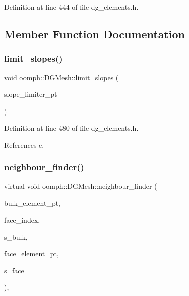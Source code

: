 Definition at line 444 of file dg\+\_\+elements.\+h.



\subsection{Member Function Documentation}
\mbox{\label{classoomph_1_1DGMesh_a0fd53356d91d991a8ad68e8a6ceb3860}} 
\subsubsection{\texorpdfstring{limit\+\_\+slopes()}{limit\_slopes()}}
{\footnotesize\ttfamily void oomph\+::\+D\+G\+Mesh\+::limit\+\_\+slopes (\begin{DoxyParamCaption}\item[{\hyperlink{classoomph_1_1SlopeLimiter}{Slope\+Limiter} $\ast$const \&}]{slope\+\_\+limiter\+\_\+pt }\end{DoxyParamCaption})\hspace{0.3cm}{\ttfamily [inline]}}



Definition at line 480 of file dg\+\_\+elements.\+h.



References e.

\mbox{\label{classoomph_1_1DGMesh_a87c47885b2e96fe1559b269686ebb7b7}} 
\subsubsection{\texorpdfstring{neighbour\+\_\+finder()}{neighbour\_finder()}}
{\footnotesize\ttfamily virtual void oomph\+::\+D\+G\+Mesh\+::neighbour\+\_\+finder (\begin{DoxyParamCaption}\item[{\hyperlink{classoomph_1_1FiniteElement}{Finite\+Element} $\ast$const \&}]{bulk\+\_\+element\+\_\+pt,  }\item[{const int \&}]{face\+\_\+index,  }\item[{const \hyperlink{classoomph_1_1Vector}{Vector}$<$ double $>$ \&}]{s\+\_\+bulk,  }\item[{\hyperlink{classoomph_1_1FaceElement}{Face\+Element} $\ast$\&}]{face\+\_\+element\+\_\+pt,  }\item[{\hyperlink{classoomph_1_1Vector}{Vector}$<$ double $>$ \&}]{s\+\_\+face }\end{DoxyParamCaption})\hspace{0.3cm}{\ttfamily [inline]}, {\ttfamily [virtual]}}



